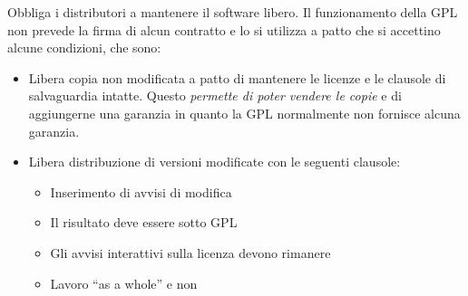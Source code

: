 Obbliga i distributori a mantenere il software libero. Il funzionamento della GPL non prevede la firma di alcun contratto e lo si utilizza a patto che si accettino alcune condizioni, che sono:
\begin{itemize}

\item Libera copia non modificata a patto di mantenere le licenze e le clausole di salvaguardia intatte. Questo \textit{permette di poter vendere le copie} e di aggiungerne una garanzia in quanto la GPL normalmente non fornisce alcuna garanzia.
\item Libera distribuzione di versioni modificate con le seguenti clausole:
  \begin{itemize}
  \item Inserimento di avvisi di modifica
  \item Il risultato deve essere sotto GPL
  \item Gli avvisi interattivi sulla licenza devono rimanere
  \item Lavoro ``as a whole'' e non
  \end{itemize}

\end{itemize}
